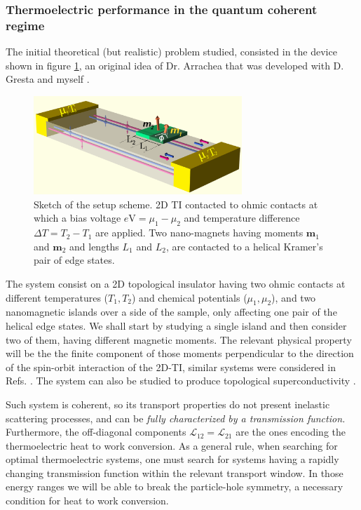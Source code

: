 \subsubsection{Thermoelectric performance in the quantum coherent regime}

The initial theoretical (but realistic) problem studied, consisted in the device shown in figure \ref{fig:teo:QSHscheme}, an original idea of Dr. Arrachea that was developed with D. Gresta and myself \cite{Gresta2019}.

\begin{figure}
    \centering
    \includegraphics[width = 0.7\textwidth]{figures/theory/QSHscheme.pdf}
    \caption{Sketch of the setup scheme. 2D TI contacted to ohmic contacts at which a bias voltage $e$V$ = \mu_1−\mu_2$ and temperature difference $\Delta T = T_2 - T_1$ are applied. Two nano-magnets having moments $\textbf{m}_1$ and $\textbf{m}_2$ and lengths $L_1$ and $L_2$, are contacted to a helical Kramer's pair of edge states.}
    \label{fig:teo:QSHscheme}
\end{figure}

The system consist on a 2D topological insulator having two ohmic contacts at different temperatures ($T_1, T_2$) and chemical potentials ($\mu_1, \mu_2$), and two nanomagnetic islands over a side of the sample, only affecting one pair of the helical edge states. We shall start by studying a single island and then consider two of them, having different magnetic moments. The relevant physical property will be the the finite component of those moments perpendicular to the direction of the spin-orbit interaction of the 2D-TI, similar systems were considered in Refs. \cite{silvestrov2016noiseless,arrachea2015nanomagnet}. The system can also be studied to produce topological superconductivity \cite{Fu2009}.  

Such system is coherent, so its transport properties do not present inelastic scattering processes, and can be \textit{fully characterized by a transmission function.} Furthermore, the off-diagonal components $\mathcal{L}_{12} = \mathcal{L}_{21}$ are the ones encoding the thermoelectric heat to work conversion. 
As a general rule, when searching for optimal thermoelectric systems, one must search for systems having a rapidly changing transmission function within the relevant transport window. In those energy ranges we will be able to break the particle-hole symmetry, a necessary condition for heat to work conversion. 

